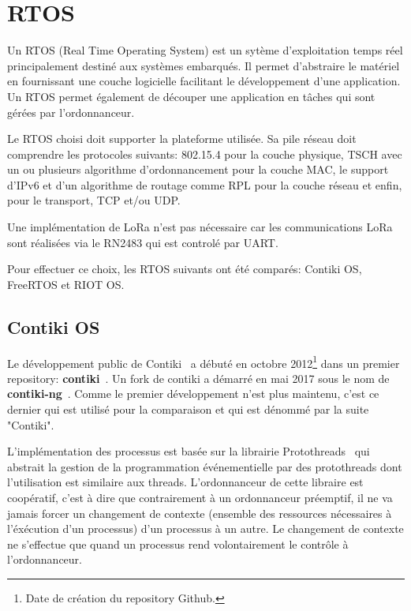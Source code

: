 \section{RTOS}

Un RTOS (Real Time Operating System) est un sytème d'exploitation temps réel principalement destiné aux systèmes embarqués. Il permet d'abstraire le matériel en fournissant une couche logicielle facilitant le développement d'une application. Un RTOS permet également de découper une application en tâches qui sont gérées par l'ordonnanceur.

%

Le RTOS choisi doit supporter la plateforme utilisée. Sa pile réseau doit comprendre les protocoles suivants: 802.15.4 pour la couche physique, TSCH avec un ou plusieurs algorithme d'ordonnancement pour la couche MAC, le support d'IPv6 et d'un algorithme de routage comme RPL pour la couche réseau et enfin, pour le transport, TCP et/ou UDP.

Une implémentation de LoRa n'est pas nécessaire car les communications LoRa sont réalisées via le 
RN2483 qui est controlé par UART.

Pour effectuer ce choix, les RTOS suivants ont été comparés: Contiki OS, FreeRTOS et RIOT OS.

\subsection*{Contiki OS}\label{subsec:etat_art:rtos:contiki}
    Le développement public de Contiki~\cite{paper:contiki} a débuté en octobre 2012\footnote{Date de création du repository Github.} dans un premier repository: \textbf{contiki}~\cite{contiki-repo:old}. Un fork de contiki a démarré en mai 2017 sous le nom de \textbf{contiki-ng}~\cite{contiki-repo:ng}. Comme le premier développement n'est plus maintenu, c'est ce dernier qui est utilisé pour la comparaison et qui est dénommé par la suite "Contiki".

    L'implémentation des processus est basée sur la librairie Protothreads~\cite{paper:protothreads}
    qui abstrait la gestion de la programmation événementielle par des protothreads dont l'utilisation est similaire aux threads. L'ordonnanceur de cette libraire est coopératif, c'est à dire que contrairement à un ordonnanceur préemptif, il ne va jamais forcer un changement de contexte (ensemble des ressources nécessaires à l'éxécution d'un processus) d'un processus à un autre. Le changement de contexte ne s'effectue que quand un processus rend volontairement le contrôle à l'ordonnanceur.

